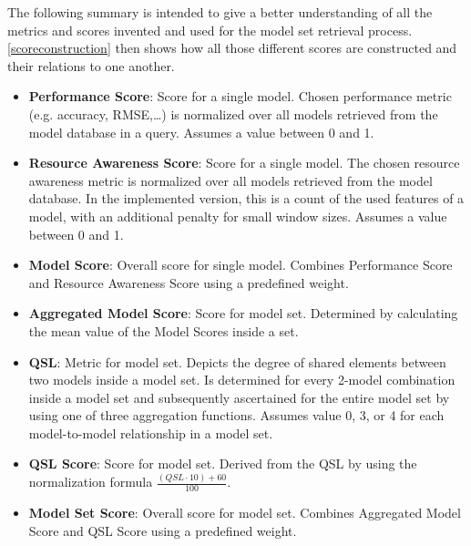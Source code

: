 The following summary is intended to give a better understanding of all the metrics and scores invented and used for the model set retrieval process. \autoref{scoreconstruction} then shows how all those different scores are constructed and their relations to one another.

\begin{itemize}
	\item \textbf{Performance Score}: Score for a single model. Chosen performance metric (e.g. accuracy, RMSE,…) is normalized over all models retrieved from the model database in a query. Assumes a value between 0 and 1.
\item \textbf{Resource Awareness Score}: Score for a single model. The chosen resource awareness metric is normalized over all models retrieved from the model database. In the implemented version, this is a count of the used features of a model, with an additional penalty for small window sizes. Assumes a value between 0 and 1.
\item \textbf{Model Score}: Overall score for single model. Combines Performance Score and Resource Awareness Score using a predefined weight. 
\item \textbf{Aggregated Model Score}: Score for model set. Determined by calculating the mean value of the Model Scores inside a set. 
\item \textbf{QSL}: Metric for model set. Depicts the degree of shared elements between two models inside a model set. Is determined for every 2-model combination inside a model set and subsequently ascertained for the entire model set by using one of three aggregation functions. Assumes value 0, 3, or 4 for each model-to-model relationship in a model set.
\item \textbf{QSL Score}: Score for model set. Derived from the QSL by using the normalization formula $\frac{(QSL \cdot 10) + 60}{100}$.
\item \textbf{Model Set Score}: Overall score for model set. Combines Aggregated Model Score and QSL Score using a predefined weight.
\end{itemize}


